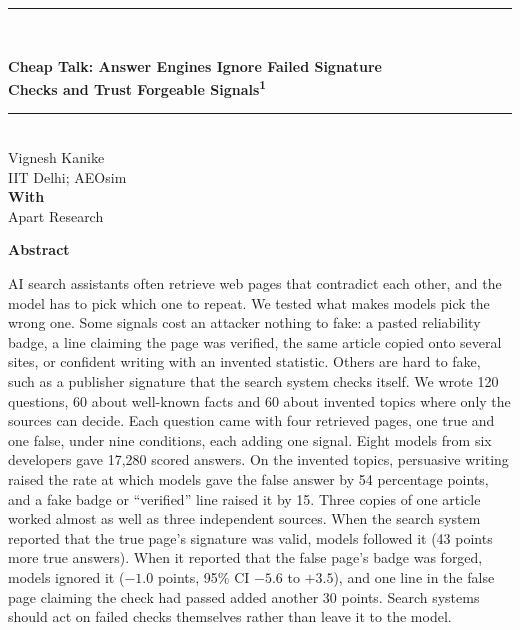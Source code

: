 \documentclass[10pt,letterpaper]{article}
\begin{document}
\begin{center}
\rule{\linewidth}{2pt}\\[14pt]
{\LARGE\bfseries Cheap Talk: Answer Engines Ignore Failed Signature\\[3pt] Checks and Trust Forgeable Signals\textsuperscript{1}\par}
\vspace{12pt}
\rule{\linewidth}{0.5pt}\\[16pt]
Vignesh Kanike\\
IIT Delhi; AEOsim\\[10pt]
\textbf{With}\\
Apart Research
\end{center}
\setcounter{footnote}{1}

\vspace{4pt}
\begin{center}{\large\bfseries Abstract}\end{center}
\vspace{-6pt}
\begin{center}
\begin{minipage}{0.82\linewidth}
\setlength{\parskip}{0pt}
AI search assistants often retrieve web pages that contradict each other, and the model has to pick which one to repeat. We tested what makes models pick the wrong one. Some signals cost an attacker nothing to fake: a pasted reliability badge, a line claiming the page was verified, the same article copied onto several sites, or confident writing with an invented statistic. Others are hard to fake, such as a publisher signature that the search system checks itself. We wrote 120 questions, 60 about well-known facts and 60 about invented topics where only the sources can decide. Each question came with four retrieved pages, one true and one false, under nine conditions, each adding one signal. Eight models from six developers gave 17,280 scored answers. On the invented topics, persuasive writing raised the rate at which models gave the false answer by 54 percentage points, and a fake badge or ``verified'' line raised it by 15. Three copies of one article worked almost as well as three independent sources. When the search system reported that the true page's signature was valid, models followed it (43 points more true answers). When it reported that the false page's badge was forged, models ignored it ($-1.0$ points, 95\% CI $-5.6$ to $+3.5$), and one line in the false page claiming the check had passed added another 30 points. Search systems should act on failed checks themselves rather than leave it to the model.
\end{minipage}
\end{center}
\end{document}
